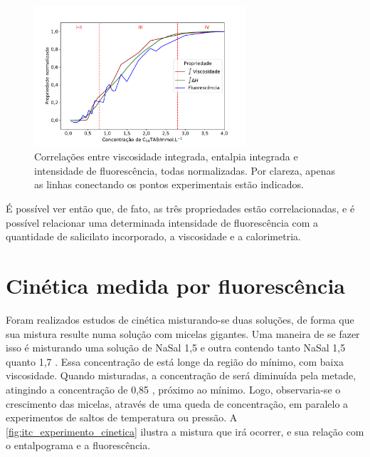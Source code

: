 	\begin{figure}[h]
		\centering
		\includegraphics[width=0.7\textwidth]{imagens/fluor/correlacoes_propriedades_zoom}
		\caption{Correlações entre viscosidade integrada, entalpia integrada e intensidade de fluorescência, todas normalizadas. Por clareza, apenas as linhas conectando os pontos experimentais estão indicados.}
		\label{fig:correlacoes_propriedades_zoom}
	\end{figure}
	
	É possível ver então que, de fato, as três propriedades estão correlacionadas, e é possível relacionar uma determinada intensidade de fluorescência com a quantidade de salicilato incorporado, a viscosidade e a calorimetria.

	\FloatBarrier	
	
	\section{Cinética medida por fluorescência} 
	
	Foram realizados estudos de cinética misturando-se duas soluções, de forma que sua mistura resulte numa solução com micelas gigantes. Uma maneira de se fazer isso é misturando uma solução de NaSal 1,5 \mM{} e outra contendo tanto NaSal 1,5 \mM{} quanto \TTAB{} 1,7 \mM. Essa concentração de \TTAB{} está longe da região do mínimo, com baixa viscosidade. Quando misturadas, a concentração de \TTAB{} será diminuída pela metade, atingindo a concentração de 0,85 \mM{}, próximo ao mínimo. Logo, observaria-se o crescimento das micelas, através de uma queda de concentração, em paralelo a experimentos de saltos de temperatura ou pressão.\cite{Hoffmann2012a} A \autoref{fig:itc_experimento_cinetica} ilustra a mistura que irá ocorrer, e sua relação com o entalpograma e a fluorescência.
	
